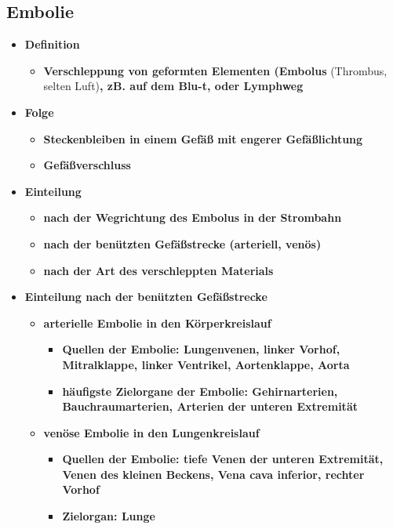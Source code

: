\subsection{Embolie}
	\begin{itemize}
		\item \textbf{Definition}
			\begin{itemize}
				\item \textbf{Verschleppung von geformten Elementen (Embolus} (Thrombus, selten Luft)\textbf{, zB. auf dem Blu-t, oder Lymphweg}
			\end{itemize}
		\item \textbf{Folge}
				\begin{itemize}
					\item \textbf{Steckenbleiben in einem Gefäß mit engerer Gefäßlichtung}
					\item \textbf{Gefäßverschluss}
				\end{itemize}
		\item \textbf{Einteilung}
			\begin{itemize}
				\item \textbf{nach der Wegrichtung des Embolus in der Strombahn}
				\item \textbf{nach der benützten Gefäßstrecke (arteriell, venös)}
				\item \textbf{nach der Art des verschleppten Materials}
			\end{itemize}
		\item \textbf{Einteilung nach der benützten Gefäßstrecke}
			\begin{itemize}
				\item \textbf{arterielle Embolie in den Körperkreislauf}
					\begin{itemize}
						\item \textbf{Quellen der Embolie: Lungenvenen, linker Vorhof, Mitralklappe, linker Ventrikel, Aortenklappe, Aorta}
						\item \textbf{häufigste Zielorgane der Embolie: Gehirnarterien, Bauchraumarterien, Arterien der unteren Extremität}
					\end{itemize}
				\item \textbf{venöse Embolie in den Lungenkreislauf}
					\begin{itemize}
						\item \textbf{Quellen der Embolie: tiefe Venen der unteren Extremität, Venen des kleinen Beckens, Vena cava inferior, rechter Vorhof}
						\item \textbf{Zielorgan: Lunge}
					\end{itemize}
			\end{itemize}
	\end{itemize}
	
